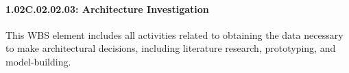 \paragraph{1.02C.02.02.03: Architecture Investigation}

This WBS element includes all activities related to obtaining the data
necessary to make architectural decisions, including literature research,
prototyping, and model-building.
